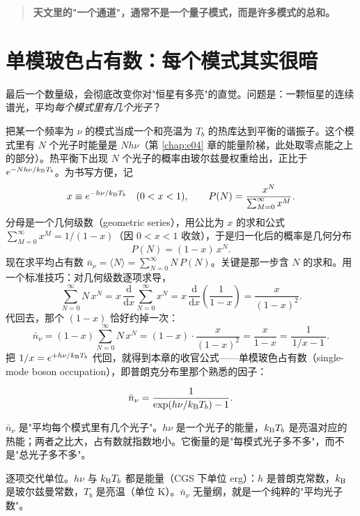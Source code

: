 \begin{quote}
\textbf{天文里的"一个通道"，通常不是一个量子模式，而是许多模式的总和。}
\end{quote}

\section{单模玻色占有数：每个模式其实很暗}
\label{sec:e05-occupation}

最后一个数量级，会彻底改变你对"恒星有多亮"的直觉。问题是：一颗恒星的连续谱光，平均\emph{每个模式里有几个光子}？

把某一个频率为 \(\nu\) 的模式当成一个和亮温为 \(T_b\) 的热库达到平衡的谐振子。这个模式里有 \(N\) 个光子时能量是 \(N h\nu\)（第 \ref{chap:e04} 章的能量阶梯，此处取零点能之上的部分）。热平衡下出现 \(N\) 个光子的概率由玻尔兹曼权重给出，正比于 \(e^{-Nh\nu/k_{\rm B}T_b}\)。为书写方便，记
\[
  x\equiv e^{-h\nu/k_{\rm B}T_b}\quad(0<x<1),\qquad
  P(N)=\frac{x^N}{\sum_{M=0}^{\infty}x^M}.
\]
分母是一个几何级数（geometric series），用公比为 \(x\) 的求和公式 \(\sum_{M=0}^{\infty}x^M=1/(1-x)\)（因 \(0<x<1\) 收敛），于是归一化后的概率是几何分布
\[
  P(N)=(1-x)\,x^N .
\]
现在求平均占有数 \(\bar n_\nu=\langle N\rangle=\sum_{N=0}^{\infty}N\,P(N)\)。关键是那一步含 \(N\) 的求和。用一个标准技巧：对几何级数逐项求导，
\[
  \sum_{N=0}^{\infty}N\,x^N
  =x\,\frac{\mathrm d}{\mathrm dx}\sum_{N=0}^{\infty}x^N
  =x\,\frac{\mathrm d}{\mathrm dx}\!\left(\frac1{1-x}\right)
  =\frac{x}{(1-x)^2}.
\]
代回去，那个 \((1-x)\) 恰好约掉一次：
\[
  \bar n_\nu=(1-x)\sum_{N=0}^{\infty}N\,x^N
  =(1-x)\cdot\frac{x}{(1-x)^2}
  =\frac{x}{1-x}
  =\frac1{\,1/x-1\,}.
\]
把 \(1/x=e^{+h\nu/k_{\rm B}T_b}\) 代回，就得到本章的收官公式——单模玻色占有数（single-mode boson occupation），即普朗克分布里那个熟悉的因子：

\begin{equation}
  \bar n_\nu=\frac1{\exp(h\nu/k_{\rm B}T_b)-1}.
  \label{eq:e05-occupation}
\end{equation}
\begin{formulaexplain}
\(\bar n_\nu\) 是"平均每个模式里有几个光子"。\(h\nu\) 是一个光子的能量，\(k_{\rm B}T_b\) 是亮温对应的热能；两者之比大，占有数就指数地小。它衡量的是"每模式光子多不多"，而不是"总光子多不多"。
\end{formulaexplain}

逐项交代单位。\(h\nu\) 与 \(k_{\rm B}T_b\) 都是能量（CGS 下单位 erg）：\(h\) 是普朗克常数，\(k_{\rm B}\) 是玻尔兹曼常数，\(T_b\) 是亮温（单位 K）。\(\bar n_\nu\) 无量纲，就是一个纯粹的"平均光子数"。

